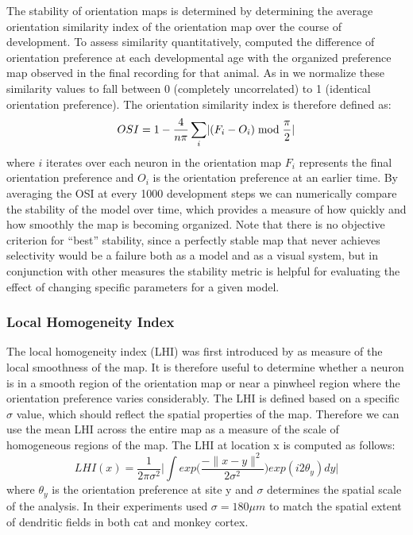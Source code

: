The stability of orientation maps is determined by determining the
average orientation similarity index of the orientation map over the
course of development. To assess similarity quantitatively,
\cite{Chapman1996} computed the difference of orientation preference
at each developmental age with the organized preference map observed
in the final recording for that animal. As in \cite{Stevens2013} we
normalize these similarity values to fall between 0 (completely
uncorrelated) to 1 (identical orientation preference). The orientation
similarity index is therefore defined as:
\begin{equation}
  OSI = 1 - \frac{4}{n\pi} \sum_{i}\lvert(F_{i}-O_{i})\bmod\frac{\pi}{2}\rvert
\end{equation}
where $i$ iterates over each neuron in the orientation map $F_i$
represents the final orientation preference and $O_i$ is the
orientation preference at an earlier time. By averaging the OSI at
every 1000 development steps we can numerically compare the stability
of the model over time, which provides a measure of how quickly and
how smoothly the map is becoming organized. Note that there is no
objective criterion for ``best'' stability, since a perfectly stable
map that never achieves selectivity would be a failure both as a model
and as a visual system, but in conjunction with other measures the
stability metric is helpful for evaluating the effect of changing
specific parameters for a given model.

\subsubsection*{Local Homogeneity Index}

The local homogeneity index (LHI) was first introduced by
\cite{Nauhaus2008} as measure of the local smoothness of the map. It
is therefore useful to determine whether a neuron is in a smooth
region of the orientation map or near a pinwheel region where the
orientation preference varies considerably. The LHI is defined based
on a specific $\sigma$ value, which should reflect the spatial
properties of the map. Therefore we can use the mean LHI across the
entire map as a measure of the scale of homogeneous regions of the
map. The LHI at location x is computed as follows:
\begin{equation}
  LHI(x) = \frac{1}{2\pi \sigma^2} \bigg\lvert \int
  exp\bigg(\frac{-\|x-y\|^2}{2\sigma^2}\bigg) exp(i2\theta_y) dy
  \bigg\rvert
\end{equation}
where $\theta_y$ is the orientation preference at site y and $\sigma$
determines the spatial scale of the analysis. In their experiments
\cite{Nauhaus2008} used $\sigma=180\mu m$ to match the spatial extent
of dendritic fields in both cat and monkey cortex.

